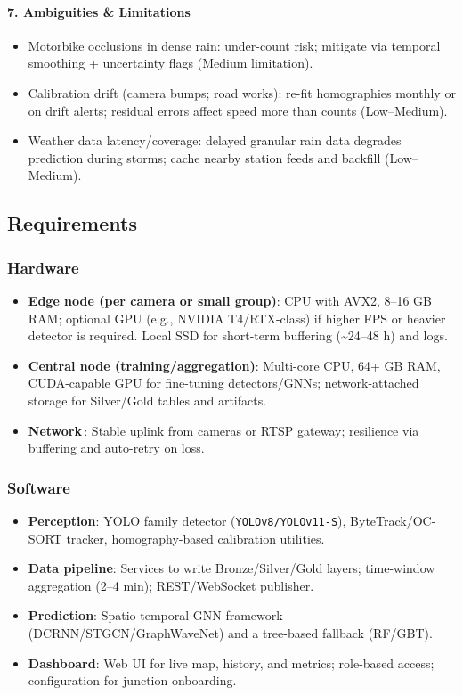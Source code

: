 \paragraph{7. Ambiguities \& Limitations}
\begin{itemize}
  \item Motorbike occlusions in dense rain: under-count risk; mitigate via temporal smoothing + uncertainty flags (Medium limitation).
  \item Calibration drift (camera bumps; road works): re-fit homographies monthly or on drift alerts; residual errors affect speed more than counts (Low--Medium).
  \item Weather data latency/coverage: delayed granular rain data degrades prediction during storms; cache nearby station feeds and backfill (Low--Medium).
\end{itemize}

\subsection{Requirements}
\subsubsection{Hardware}
\begin{itemize}
  \item \textbf{Edge node (per camera or small group)}: CPU with AVX2, 8--16 GB RAM; optional GPU (e.g., NVIDIA T4/RTX-class) if higher FPS or heavier detector is required. Local SSD for short-term buffering (\textasciitilde24--48 h) and logs.
  \item \textbf{Central node (training/aggregation)}: Multi-core CPU, 64+ GB RAM, CUDA-capable GPU for fine-tuning detectors/GNNs; network-attached storage for Silver/Gold tables and artifacts.
  \item \textbf{Network}\,: Stable uplink from cameras or RTSP gateway; resilience via buffering and auto-retry on loss.
\end{itemize}

\subsubsection{Software}
\begin{itemize}
  \item \textbf{Perception}: YOLO family detector (\texttt{YOLOv8/YOLOv11-S}), ByteTrack/OC-SORT tracker, homography-based calibration utilities.
  \item \textbf{Data pipeline}: Services to write Bronze/Silver/Gold layers; time-window aggregation (2--4 min); REST/WebSocket publisher.
  \item \textbf{Prediction}: Spatio-temporal GNN framework (DCRNN/STGCN/GraphWaveNet) and a tree-based fallback (RF/GBT).
  \item \textbf{Dashboard}: Web UI for live map, history, and metrics; role-based access; configuration for junction onboarding.
\end{itemize}

